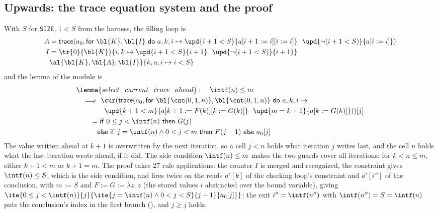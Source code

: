 \subsection{Upwards: the trace equation system and the proof}
With $S$ for \texttt{SIZE}, $1 < S$ from the harness, the filling loop is
\begin{align}
  A &= \mathsf{trace}(a_0, \mathsf{for}\ \bl{K}, \bl{I}\ \mathsf{do}\ a, k, i \mapsto \upd{i + 1 < S}{a[i + 1 := i][i := i]}\ \ \upd{\neg(i + 1 < S)}{a[i := i]}) \label{eq:rw1}\\
  I &= \tr{0}{\bl{K}}{i, k \mapsto \upd{i + 1 < S}{i + 1}\ \ \upd{\neg(i + 1 < S)}{i + 1}} \nonumber\\
  &\al{\bl{K}, \bl{A}, \bl{I}}{k, a, i \mapsto i < S} \nonumber
\end{align}
and the lemma of the module is
\begin{align*}
  &\lemma{select\_current\_trace\_ahead}:\quad \intf(n) \le m\\
  &\quad\Longrightarrow\ \cur(\mathsf{trace}(a_0, \mathsf{for}\ \bl{\cnt(0, 1, n)}, \bl{\cnt(0, 1, n)}\ \mathsf{do}\ a, k, i \mapsto {}\\
  &\qquad\qquad \upd{k + 1 < m}{a[k + 1 := F(k)][k := G(k)]}\ \ \upd{m = k + 1}{a[k := G(k)]}))[j]\\
  &\qquad = \mathsf{if}\ 0 \le j < \intf(n)\ \mathsf{then}\ G(j)\\
  &\qquad\quad \mathsf{else\ if}\ j = \intf(n) \wedge 0 < j < m\ \mathsf{then}\ F(j - 1)\ \mathsf{else}\ a_0[j]
\end{align*}
The value written ahead at $k + 1$ is overwritten by the next iteration, so a cell $j < n$ holds what
iteration $j$ writes last, and the cell $n$ holds what the last iteration wrote ahead, if it did. The side
condition $\intf(n) \le m$ makes the two guards cover all iterations: for $k < n \le m$, either $k + 1 < m$
or $k + 1 = m$. The proof takes 27 rule applications: the counter $I$ is merged and recognized, the
constraint gives $\intf(n) \le S$, which is the side condition, and 
fires twice on the reads $a'[k]$ of the checking loop's constraint and $a'[i'']$ of the conclusion, with
$m := S$ and $F := G := \lambda z.\ z$ (the stored values $i$ abstracted over the bound variable), giving
$\ite{0 \le j < \intf(n)}{j}{\ite{j = \intf(n) \wedge 0 < j < S}{j - 1}{a_0[j]}}$; the exit
$i'' = \intf(n'')$ with $\intf(n'') = S = \intf(n)$ puts the conclusion's index in the first branch
(), and $j \ge j$ holds.

